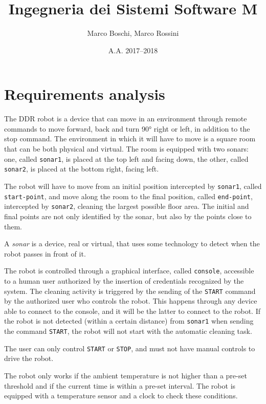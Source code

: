 

\title{Ingegneria dei Sistemi Software M}
\date{A.A. 2017--2018}
\author{Marco Boschi, Marco Rossini}



\maketitletoc

\section{Requirements analysis}
The DDR robot is a device that can move in an environment through remote commands to move forward, back and turn \ang{90} right or left, in addition to the stop command. The environment in which it will have to move is a square room that can be both physical and virtual. The room is equipped with two sonars: one, called \texttt{sonar1}, is placed at the top left and facing down, the other, called \texttt{sonar2}, is placed at the bottom right, facing left.

The robot will have to move from an initial position intercepted by \texttt{sonar1}, called \texttt{start-point}, and move along the room to the final position, called \texttt{end-point}, intercepted by \texttt{sonar2}, cleaning the largest possible floor area. The initial and final points are not only identified by the sonar, but also by the points close to them.

A \textit{sonar} is a device, real or virtual, that uses some technology to detect when the robot passes in front of it.

The robot is controlled through a graphical interface, called \texttt{console}, accessible to a human user authorized by the insertion of credentials recognized by the system. The cleaning activity is triggered by the sending of the \texttt{START} command by the authorized user who controls the robot. This happens through any device able to connect to the console, and it will be the latter to connect to the robot. If the robot is not detected (within a certain distance) from \texttt{sonar1} when sending the command \texttt{START}, the robot will not start with the automatic cleaning task.

The user can only control \texttt{START} or \texttt{STOP}, and must not have manual controls to drive the robot.

The robot only works if the ambient temperature is not higher than a pre-set threshold and if the current time is within a pre-set interval. The robot is equipped with a temperature sensor and a clock to check these conditions.

